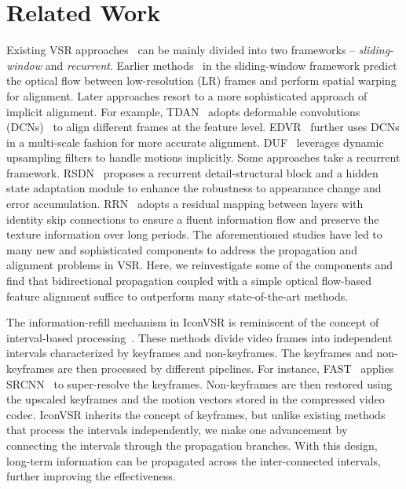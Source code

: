 \documentclass[final]{cvpr}
\begin{document}
\section{Related Work}
\label{sec:relatedwork}
Existing VSR approaches~\cite{huang2015bidirectional,liu2014bayesian,takeda2009super,yi2019progressive,li2020mucan,isobe2020video1,isobe2020video} can be mainly divided into two frameworks -- \textit{sliding-window} and \textit{recurrent}. Earlier methods~\cite{caballero2017real,tao2017detail,xue2019video} in the sliding-window framework predict the optical flow between low-resolution (LR) frames and perform spatial warping for alignment. Later approaches resort to a more sophisticated approach of implicit alignment. For example, TDAN~\cite{tian2018tdan} adopts deformable convolutions (DCNs)~\cite{dai2017deformable,zhu2019deformable} to align different frames at the feature level. EDVR~\cite{wang2019edvr} further uses DCNs in a multi-scale fashion for more accurate alignment. DUF~\cite{jo2018deep} leverages dynamic upsampling filters to handle motions implicitly.
Some approaches take a recurrent framework. RSDN~\cite{isobe2020video1} proposes a recurrent detail-structural block and a hidden state adaptation module to enhance the robustness to appearance change and error accumulation. RRN~\cite{isobe2020revisiting} adopts a residual mapping between layers with identity skip connections to ensure a fluent information flow and preserve the texture information over long periods.
The aforementioned studies have led to many new and sophisticated components to address the propagation and alignment problems in VSR. Here, we reinvestigate some of the components and find that bidirectional propagation coupled with a simple optical flow-based feature alignment suffice to outperform many state-of-the-art methods.

The information-refill mechanism in \mbox{IconVSR} is reminiscent of the concept of interval-based processing~\cite{chen2018optimizing,jain2019accel,shelhamer2016clockwork,zhang2017fast,zhu2018towards,zhu2017flow,zhu2017deep}. These methods divide video frames into independent intervals characterized by keyframes and non-keyframes. The keyframes and non-keyframes are then processed by different pipelines. For instance, FAST~\cite{zhang2017fast} applies SRCNN~\cite{dong2014learning,dong2016image} to super-resolve the keyframes. Non-keyframes are then restored using the upscaled keyframes and the motion vectors stored in the compressed video codec.
\mbox{IconVSR} inherits the concept of keyframes, but unlike existing methods that process the intervals independently, we make one advancement by connecting the intervals through the propagation branches. With this design, long-term information can be propagated across the inter-connected intervals, further improving the effectiveness.
\end{document}
